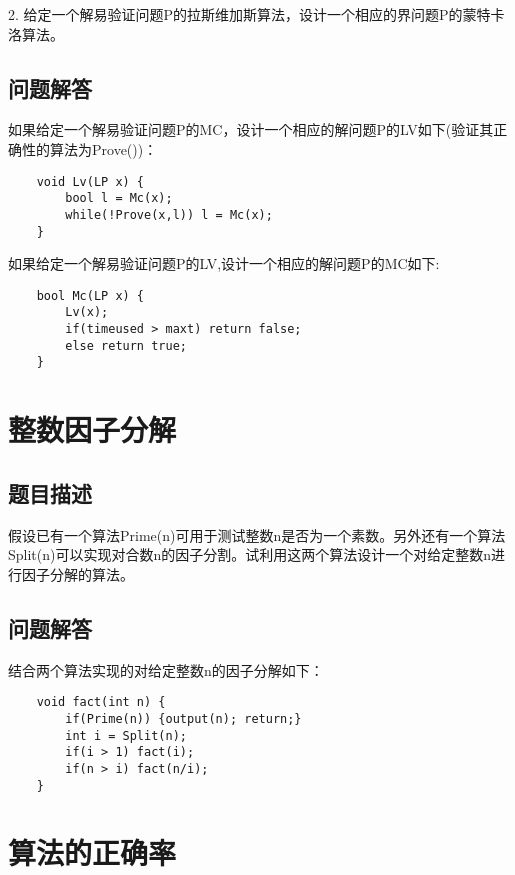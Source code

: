 \documentclass[UTF8]{ctexart}
\begin{document}
    2. 给定一个解易验证问题P的拉斯维加斯算法，设计一个相应的界问题P的蒙特卡洛算法。
    \subsection{问题解答}
    如果给定一个解易验证问题P的MC，设计一个相应的解问题P的LV如下(验证其正确性的算法为Prove())：
    
    \begin{small}
    \begin{lstlisting}
    void Lv(LP x) {
        bool l = Mc(x);
        while(!Prove(x,l)) l = Mc(x);
    }
    \end{lstlisting}
    \end{small}
    
    如果给定一个解易验证问题P的LV,设计一个相应的解问题P的MC如下:
    
    \begin{small}
    \begin{lstlisting}
    bool Mc(LP x) {
        Lv(x);
        if(timeused > maxt) return false;
        else return true;
    }
    \end{lstlisting}
    \end{small}
    
    \section{整数因子分解}
    \subsection{题目描述}
    假设已有一个算法Prime(n)可用于测试整数n是否为一个素数。另外还有一个算法Split(n)可以实现对合数n的因子分割。试利用这两个算法设计一个对给定整数n进行因子分解的算法。
    \subsection{问题解答}
    结合两个算法实现的对给定整数n的因子分解如下：
    
    \begin{small}
    \begin{lstlisting}
    void fact(int n) {
        if(Prime(n)) {output(n); return;}
        int i = Split(n);
        if(i > 1) fact(i);
        if(n > i) fact(n/i);
    }
    \end{lstlisting}
    \end{small}
    
    
    \section{算法的正确率}
\end{document}
